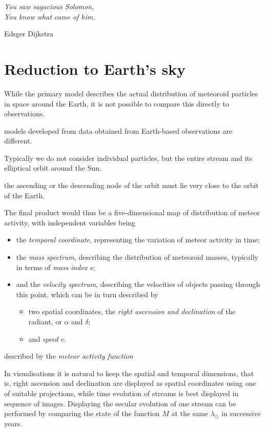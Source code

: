\epigraph{\it
    You saw sagacious Solomon,\\
    You know what came of him,
}{\vspace{2mm}Edsger Dijkstra}


\section{Reduction to Earth's sky} \label{ir}
    While the primary model describes the actual distribution of meteoroid particles in space around the Earth,
    it is not possible to compare this directly to observations.

    models developed from data obtained from Earth-based observations are different.

    Typically we do not consider individual particles, but the entire stream and its elliptical orbit around the Sun.

    the ascending or the descending node of the orbit must lie very close to the orbit of the Earth.




    The final product would thus be a five-dimensional map of distribution of meteor activity, with independent variables being
    \begin{itemize}
        \item the \emph{temporal coordinate}, representing the variation of meteor activity in time;
        \item the \emph{mass spectrum}, describing the distribution of meteoroid masses, typically in terms of \textit{mass index} $s$;
        \item and the \emph{velocity spectrum}, describing the velocities of objects passing through this point, which can be in turn described by
            \begin{itemize}
                \item two spatial coordinates, the \emph{right ascension and declination} of the radiant, or $\alpha$ and $\delta$;
                \item and \emph{speed} $v$.
            \end{itemize}
    \end{itemize}

    described by the \emph{meteor activity function}

    In visualisations it is natural to keep the spatial and temporal dimensions, that is, right ascension and declination are
    displayed as spatial coordinates using one of suitable projections, while time evolution of streams is best displayed
    in sequence of images.
    Displaying the secular evolution of one stream can be performed by comparing the state of the function $M$ at
    the same $\lambda_\odot$ in successive years.

